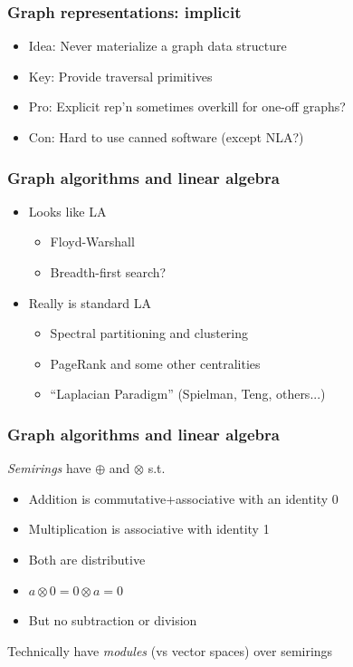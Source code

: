 \documentclass{beamer}
\begin{document}
\begin{frame}
  \frametitle{Graph representations: implicit}

  \begin{itemize}
  \item Idea: Never materialize a graph data structure
  \item Key: Provide traversal primitives
  \item Pro: Explicit rep'n sometimes overkill for one-off graphs?
  \item Con: Hard to use canned software (except NLA?)
  \end{itemize}
\end{frame}

\begin{frame}
  \frametitle{Graph algorithms and linear algebra}

  \begin{itemize}
  \item Looks like LA
    \begin{itemize}
    \item Floyd-Warshall
    \item Breadth-first search?
    \end{itemize}
  \item Really is standard LA
    \begin{itemize}
    \item Spectral partitioning and clustering
    \item PageRank and some other centralities
    \item ``Laplacian Paradigm'' (Spielman, Teng, others...)
    \end{itemize}
  \end{itemize}
\end{frame}

\begin{frame}
  \frametitle{Graph algorithms and linear algebra}

  {\em Semirings} have $\oplus$ and $\otimes$ s.t.
  \begin{itemize}
  \item Addition is commutative+associative with an identity 0
  \item Multiplication is associative with identity 1
  \item Both are distributive
  \item $a \otimes 0 = 0 \otimes a = 0$
  \item But no subtraction or division
  \end{itemize}
  Technically have {\em modules} (vs vector spaces) over semirings
\end{frame}
\end{document}
